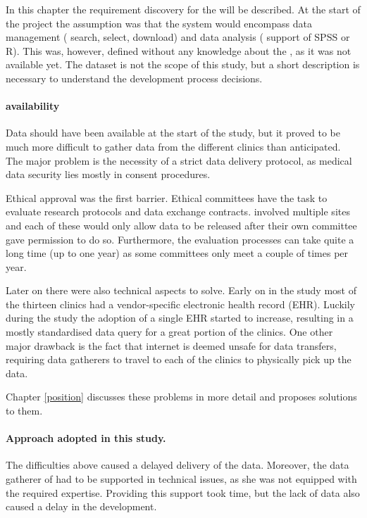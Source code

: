 In this chapter the requirement discovery for the \ivfsystem{} will be described.
At the start of the project the assumption was that the system would encompass data management (\eg{} search, select, download) and data analysis (\eg{} support of SPSS or R).
This was, however, defined without any knowledge about the \projectdata{}, as it was not available yet.
The dataset is not the scope of this study, but a short description is necessary to understand the development process decisions.

\paragraph{\projectdata{} availability}
Data should have been available at the start of the study, but it proved to be much more difficult to gather data from the different clinics than anticipated.
The major problem is the necessity of a strict data delivery protocol, as medical data security lies mostly in consent procedures.

Ethical approval was the first barrier. Ethical committees have the task to evaluate research protocols and data exchange contracts.
\project{} involved multiple sites and each of these would only allow data to be released after their own committee gave permission to do so.
Furthermore, the evaluation processes can take quite a long time (up to one year) as some committees only meet a couple of times per year.

Later on there were also technical aspects to solve.
Early on in the study most of the thirteen clinics had a vendor-specific electronic health record (EHR).
Luckily during the study the adoption of a single EHR started to increase, resulting in a mostly standardised data query for a great portion of the clinics.
One other major drawback is the fact that internet is deemed unsafe for data transfers, requiring data gatherers to travel to each of the clinics to physically pick up the data.


Chapter \ref{position} discusses these problems in more detail and  proposes solutions to them.

\paragraph{Approach adopted in this study.}
The difficulties above caused a delayed delivery of the data. Moreover,
the data gatherer of \project{} had to be supported in technical issues, as she was not equipped with the required expertise. 
Providing this support took time, but the lack of data also caused a delay in the \ivfsystem{} development.


